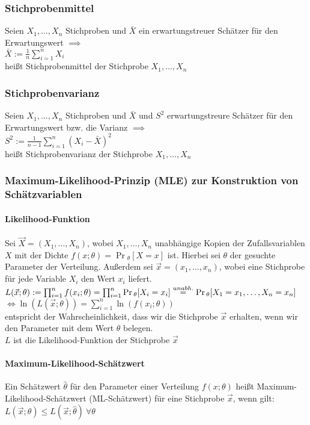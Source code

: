 \documentclass[a4paper,9pt]{extarticle}
\begin{document}
\subsubsection*{Stichprobenmittel}
Seien $X_1, \dots, X_n$ Stichproben und $\bar X$ ein erwartungstreuer Schätzer für den Erwartungswert $\implies$ \\
$\bar X := \frac 1 n \sum_{i=1}^n X_i$ \\
heißt Stichprobenmittel der Stichprobe $X_1, \dots, X_n$

\subsubsection*{Stichprobenvarianz}
Seien $X_1, \dots, X_n$ Stichproben und $\bar X$ und $S^2$ erwartungstreure Schätzer für den Erwartungswert bzw. die Varianz $\implies$ \\
$S^2 := \frac{1}{n - 1} \sum_{i=1}^n (X_i - \bar{X})^2$ \\
heißt Stichprobenvarianz der Stichprobe $X_1, \dots, X_n$

\subsubsection*{Maximum-Likelihood-Prinzip (MLE) zur Konstruktion von Schätzvariablen}
\paragraph*{Likelihood-Funktion}
Sei $\vec{X} = (X_1, \dots, X_n)$, wobei $X_1, \dots, X_n$ unabhängige Kopien der Zufallsvariablen $X$ mit der Dichte $f(x;\theta) = \Pr{}_{\theta}[X = x]$ ist. Hierbei sei $\theta$ der gesuchte Parameter der Verteilung.
Außerdem sei $\vec{x} = (x_1, \dots, x_n)$, wobei eine Stichprobe für jede Variable $X_i$ den Wert $x_i$ liefert. \\

$L(\vec x; \theta) := \prod_{i=1}^n f(x_i; \theta) = \prod_{i = 1}^{n} \Pr{}_{\theta} [X_i = x_i] \\
\stackrel{unabh.}{=} \Pr{}_{\theta} [X_1 = x_1, \dots, X_n = x_n]$ \\
$\iff \ln(L(\vec x; \theta)) = \sum_{i=1}^n \ln(f(x_i; \theta))$ \\
entspricht der Wahrscheinlichkeit, dass wir die Stichprobe $\vec{x}$ erhalten, wenn wir den Parameter mit dem Wert $\theta$ belegen. \\
$L$ ist die Likelihood-Funktion der Stichprobe $\vec x$

\paragraph*{Maximum-Likelihood-Schätzwert}
Ein Schätzwert $\hat{\theta}$ für den Parameter einer Verteilung $f(x;\theta)$ heißt Maximum-Likelihood-Schätzwert (ML-Schätzwert) für eine Stichprobe $\vec x$, wenn gilt: \\
$L(\vec x; \theta) ≤ L(\vec x; \hat{\theta}) ~ \forall \theta$ \\
\end{document}
